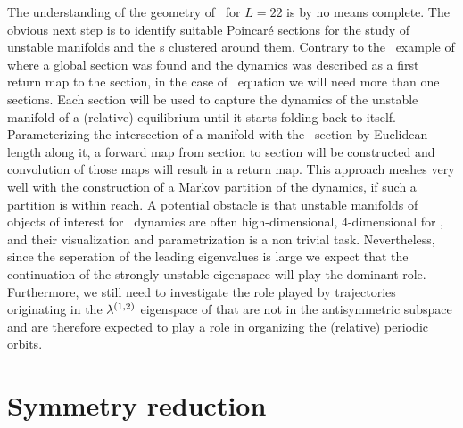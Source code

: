 {The understanding of the geometry of \KSe\ for $L=22$ is by no means complete.
The obvious next step is to identify
suitable Poincar\'e sections for the study of unstable manifolds and the \rpo s clustered around them. 
Contrary to the \CLe\ example of 
where a global section was found and the dynamics was described as a first return map to the section,
in the case of \KS\ equation we will need more than one sections. Each section will be used to
capture the dynamics of the unstable manifold of a (relative) equilibrium until it starts folding back
to itself. Parameterizing the intersection of a manifold with the \Poincare\ section by Euclidean length along it,
a forward map from section to section will be constructed and convolution of those maps will result in a return map. This approach
meshes very well with the construction of a Markov partition of the dynamics, if such a partition
is within reach. A potential obstacle is that unstable manifolds of objects of interest for \KS\ dynamics are often high-dimensional,
\eg $4$-dimensional for , and their visualization and parametrization is a non trivial task.
Nevertheless, since the seperation of the leading eigenvalues is large we expect that the continuation of the strongly unstable eigenspace will play the dominant role. Furthermore, we still need to investigate the role played by trajectories originating in the $\eigExp[1,2]$ eigenspace of  that are not in the antisymmetric 
subspace and are therefore expected to
play a role in organizing the (relative) periodic orbits.
}

\section{Symmetry reduction}

